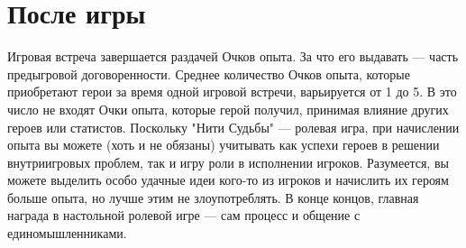 \section{После игры}
Игровая встреча завершается раздачей Очков опыта. За что его выдавать — часть предыгровой договоренности. Среднее количество Очков опыта, которые приобретают герои за время одной игровой встречи, варьируется от 1 до 5. В это число не входят Очки опыта, которые герой получил, принимая влияние других героев или статистов.
\newline
Поскольку "Нити Судьбы" — ролевая игра, при начислении опыта вы можете (хоть и не обязаны) учитывать как успехи героев в решении внутриигровых проблем, так и игру роли в исполнении игроков.
\newline
Разумеется, вы можете выделить особо удачные идеи кого-то из игроков и начислить их героям больше опыта, но лучше этим не злоупотреблять. В конце концов, главная награда в настольной ролевой игре — сам процесс и общение с единомышленниками.
